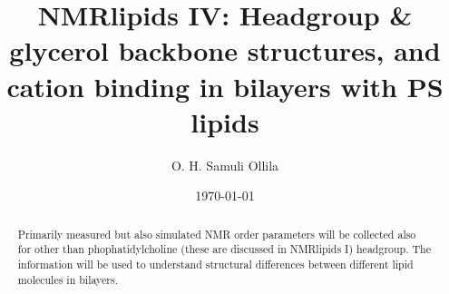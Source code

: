 \documentclass[aps,prl,superscriptaddress,twocolumn]{revtex4}
\begin{document}

\title{NMRlipids IV: Headgroup \& glycerol backbone structures, and cation binding in bilayers with PS lipids} %



\author{O. H. Samuli Ollila}



\date{\today}

\begin{abstract}
  Primarily measured but also simulated NMR order parameters will be collected also for other than phophatidylcholine
  (these are discussed in NMRlipids I) headgroup. The information will be used to understand structural differences between 
  different lipid molecules in bilayers.
\end{abstract}


\maketitle %

\end{document}
